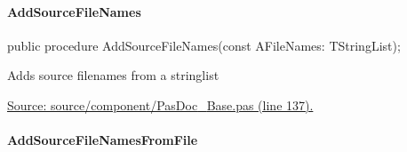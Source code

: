 \documentclass{report}
\newif\ifpdf
\begin{document}
\paragraph*{AddSourceFileNames}\hspace*{\fill}

\label{PasDoc_Base.TPasDoc-AddSourceFileNames}
\begin{list}{}{
\setlength{\itemindent}{0cm}
\setlength{\listparindent}{0cm}
\setlength{\leftmargin}{\evensidemargin}
\addtolength{\leftmargin}{\tmplength}
\settowidth{\labelsep}{X}
\addtolength{\leftmargin}{\labelsep}
\setlength{\labelwidth}{\tmplength}
}
\item[\textbf{Declaration}\hfill]
\ifpdf
\begin{flushleft}
\fi
\begin{ttfamily}
public procedure AddSourceFileNames(const AFileNames: TStringList);\end{ttfamily}

\ifpdf
\end{flushleft}
\fi

\par
\item[\textbf{Description}]
Adds source filenames from a stringlist\par
\href{https://github.com/pasdoc/pasdoc/blob/master/source/component/PasDoc_Base.pas#L137}{Source: source/component/PasDoc{\_}Base.pas (line 137).}

\end{list}
\paragraph*{AddSourceFileNamesFromFile}\hspace*{\fill}
\end{document}
